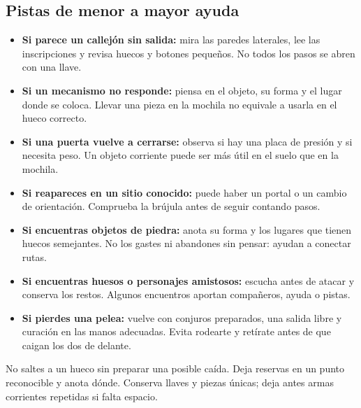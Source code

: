 \subsection*{Pistas de menor a mayor ayuda}
\begin{itemize}
\item \textbf{Si parece un callejón sin salida:} mira las paredes laterales, lee las inscripciones y revisa huecos y botones pequeños. No todos los pasos se abren con una llave.
\item \textbf{Si un mecanismo no responde:} piensa en el objeto, su forma y el lugar donde se coloca. Llevar una pieza en la mochila no equivale a usarla en el hueco correcto.
\item \textbf{Si una puerta vuelve a cerrarse:} observa si hay una placa de presión y si necesita peso. Un objeto corriente puede ser más útil en el suelo que en la mochila.
\item \textbf{Si reapareces en un sitio conocido:} puede haber un portal o un cambio de orientación. Comprueba la brújula antes de seguir contando pasos.
\item \textbf{Si encuentras objetos de piedra:} anota su forma y los lugares que tienen huecos semejantes. No los gastes ni abandones sin pensar: ayudan a conectar rutas.
\item \textbf{Si encuentras huesos o personajes amistosos:} escucha antes de atacar y conserva los restos. Algunos encuentros aportan compañeros, ayuda o pistas.
\item \textbf{Si pierdes una pelea:} vuelve con conjuros preparados, una salida libre y curación en las manos adecuadas. Evita rodearte y retírate antes de que caigan los dos de delante.
\end{itemize}

No saltes a un hueco sin preparar una posible caída. Deja reservas en un punto reconocible y anota dónde. Conserva llaves y piezas únicas; deja antes armas corrientes repetidas si falta espacio.

